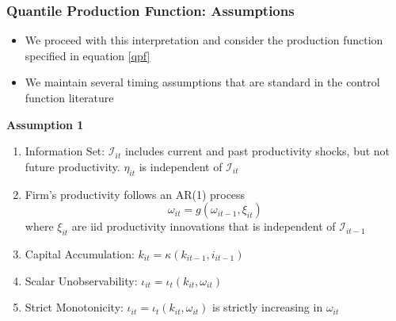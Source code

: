 \documentclass{beamer}
\begin{document}

\begin{frame}
\frametitle{Quantile Production Function: Assumptions}
\begin{itemize}
	\item We proceed with this interpretation and consider the production function specified in equation \eqref{qpf}
	\item We maintain several timing assumptions that are standard in the control function literature
\end{itemize}
\textbf{Assumption 1}
\begin{enumerate}
	\item Information Set: $\mathcal{I}_{it}$ includes current and past productivity shocks, but not future productivity. $\eta_{it}$ is independent of $\mathcal{I}_{it}$
	\item Firm's productivity follows an AR(1) process
	\begin{equation}
		\omega_{it}=g(\omega_{it-1}, \xi_{it})
	\end{equation}
	where $\xi_{it}$ are iid productivity innovations that is independent of $\mathcal{I}_{it-1}$
	\item Capital Accumulation: $k_{it}=\kappa(k_{it-1}, i_{it-1})$
	\item Scalar Unobservability: $\iota_{it}=\iota_{t}(k_{it}, \omega_{it})$
	\item Strict Monotonicity: $\iota_{it}=\iota_{t}(k_{it}, \omega_{it})$ is strictly increasing in $\omega_{it}$
\end{enumerate}
\end{frame}

\end{document}
